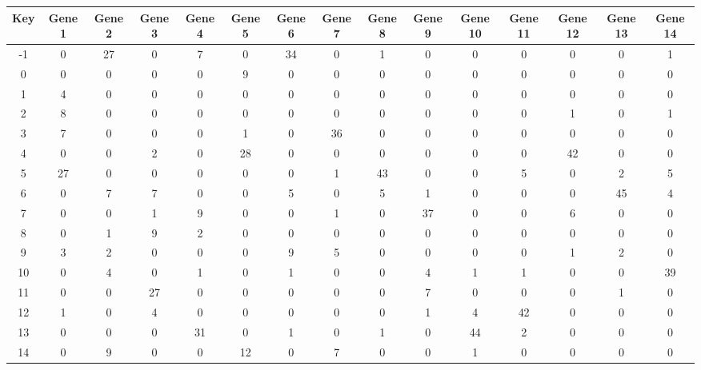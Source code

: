 \begin{tabular}{|c|c|c|c|c|c|c|c|c|c|c|c|c|c|c|}
\hline
Key & Gene 1 & Gene 2 & Gene 3 & Gene 4 & Gene 5 & Gene 6 & Gene 7 & Gene 8 & Gene 9 & Gene 10 & Gene 11 & Gene 12 & Gene 13 & Gene 14 \\
\hline
-1 & 0 & 27 & 0 & 7 & 0 & 34 & 0 & 1 & 0 & 0 & 0 & 0 & 0 & 1 \\
0 & 0 & 0 & 0 & 0 & 9 & 0 & 0 & 0 & 0 & 0 & 0 & 0 & 0 & 0 \\
1 & 4 & 0 & 0 & 0 & 0 & 0 & 0 & 0 & 0 & 0 & 0 & 0 & 0 & 0 \\
2 & 8 & 0 & 0 & 0 & 0 & 0 & 0 & 0 & 0 & 0 & 0 & 1 & 0 & 1 \\
3 & 7 & 0 & 0 & 0 & 1 & 0 & 36 & 0 & 0 & 0 & 0 & 0 & 0 & 0 \\
4 & 0 & 0 & 2 & 0 & 28 & 0 & 0 & 0 & 0 & 0 & 0 & 42 & 0 & 0 \\
5 & 27 & 0 & 0 & 0 & 0 & 0 & 1 & 43 & 0 & 0 & 5 & 0 & 2 & 5 \\
6 & 0 & 7 & 7 & 0 & 0 & 5 & 0 & 5 & 1 & 0 & 0 & 0 & 45 & 4 \\
7 & 0 & 0 & 1 & 9 & 0 & 0 & 1 & 0 & 37 & 0 & 0 & 6 & 0 & 0 \\
8 & 0 & 1 & 9 & 2 & 0 & 0 & 0 & 0 & 0 & 0 & 0 & 0 & 0 & 0 \\
9 & 3 & 2 & 0 & 0 & 0 & 9 & 5 & 0 & 0 & 0 & 0 & 1 & 2 & 0 \\
10 & 0 & 4 & 0 & 1 & 0 & 1 & 0 & 0 & 4 & 1 & 1 & 0 & 0 & 39 \\
11 & 0 & 0 & 27 & 0 & 0 & 0 & 0 & 0 & 7 & 0 & 0 & 0 & 1 & 0 \\
12 & 1 & 0 & 4 & 0 & 0 & 0 & 0 & 0 & 1 & 4 & 42 & 0 & 0 & 0 \\
13 & 0 & 0 & 0 & 31 & 0 & 1 & 0 & 1 & 0 & 44 & 2 & 0 & 0 & 0 \\
14 & 0 & 9 & 0 & 0 & 12 & 0 & 7 & 0 & 0 & 1 & 0 & 0 & 0 & 0 \\
\hline
\end{tabular}